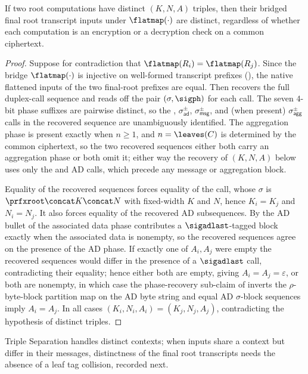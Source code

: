 \begin{proposition}
\label{cor:triple-sep}
If two \TW{} root computations have distinct $(K, N, A)$ triples, then
their bridged final root transcript inputs under $\flatmap(\cdot)$ are
distinct, regardless of whether each computation is an encryption or
a decryption check on a common ciphertext.
\end{proposition}

\begin{proof}
Suppose for contradiction that $\flatmap(R_i) = \flatmap(R_j)$. Since the
bridge $\flatmap(\cdot)$ is injective on well-formed transcript prefixes
(), the native flattened inputs of the two
final-root prefixes are equal. Then 
recovers the full duplex-call sequence and reads off the pair
$(\sigma,\sigph)$ for each call. The seven $4$-bit phase suffixes are
pairwise distinct, so the \siginit, $\sigma_{\mathsf{ad}}^\pm$,
$\sigma_{\mathsf{msg}}^\pm$, and (when present) $\sigma_{\mathsf{agg}}^\pm$
calls in the recovered sequence are unambiguously identified. The
aggregation phase is present exactly when $n \geq 1$, and
$n = \leaves(C)$ is determined by the common ciphertext, so the two
recovered sequences either both carry an aggregation phase or both omit
it; either way the recovery of $(K, N, A)$ below uses only the
\siginit and AD calls, which precede any message or aggregation block.

Equality of the recovered sequences forces equality of the \siginit
call, whose $\sigma$ is $\prfxroot \concat K \concat N$ with
fixed-width $K$ and $N$, hence $K_i = K_j$ and $N_i = N_j$. It also
forces equality of the recovered AD subsequences. By the AD bullet of
 the associated data phase contributes a
$\sigadlast$-tagged block exactly when the associated data is nonempty,
so the recovered sequences agree on the presence of the AD phase. If
exactly one of $A_i, A_j$ were empty the recovered sequences would
differ in the presence of a $\sigadlast$ call, contradicting their
equality; hence either both are empty, giving $A_i = A_j = \varepsilon$,
or both are nonempty, in which case the phase-recovery sub-claim of
 inverts the $\rho$-byte-block partition map on
the AD byte string and equal AD $\sigma$-block sequences imply
$A_i = A_j$. In all cases $(K_i, N_i, A_i) = (K_j, N_j, A_j)$,
contradicting the hypothesis of distinct triples.
\end{proof}

Triple Separation handles distinct contexts; when inputs share a context
but differ in their messages, distinctness of the final root transcripts
needs the absence of a leaf tag collision, recorded next.


